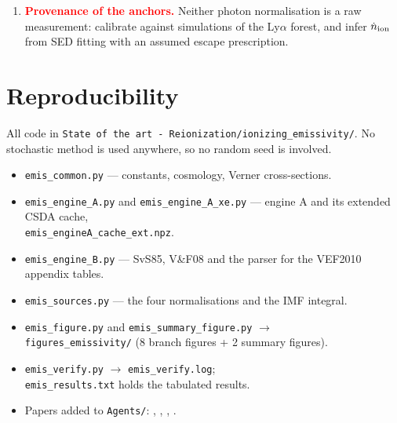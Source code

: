 \documentclass[11pt,a4paper]{article}
\newcommand{\flag}[1]{\textbf{\textcolor{red}{#1}}}
\begin{document}
\begin{enumerate}
  asserted: the H\,\textsc{i}/He\,\textsc{i} split (engine A gives
  $f_{\rm HeI}/f_{\rm HI}\to0.0871$ against $0.0637$ from
  \citeauthor{ShullVanSteenberg1985} rescaled to the Planck helium abundance,
  a 37 per cent difference that cannot be resolved because their helium fits
  assume $x_{\rm HeII}=x_{\rm HII}$); and the two photon emissivity
  normalisations, which are inputs that nothing here can falsify.  The split
  is however shown to be insensitive to the shape of $\Lambda$: tripling the
  helium term moves $f_{\rm HeI}$ by 2.8 per cent at 100~eV and $<0.2$ per
  cent above 1~keV, which is the derivation's own claim.
\item \flag{Provenance of the anchors.}  Neither photon normalisation is a raw
  measurement: \citet{Gaikwad2023} calibrate against simulations of the
  Ly$\alpha$ forest, and \citet{Giovinazzo2026} infer $\dot n_{\rm ion}$ from
  SED fitting with an assumed escape prescription.
\end{enumerate}

\section*{Reproducibility}
All code in \texttt{State of the art - Reionization/ionizing\_emissivity/}.
No stochastic method is used anywhere, so no random seed is involved.
\begin{itemize}\itemsep1pt
\item \texttt{emis\_common.py} --- constants, cosmology, Verner cross-sections.
\item \texttt{emis\_engine\_A.py} and \texttt{emis\_engine\_A\_xe.py} ---
  engine A and its extended CSDA cache,\\
  \texttt{emis\_engineA\_cache\_ext.npz}.
\item \texttt{emis\_engine\_B.py} --- SvS85, V\&F08 and the parser for the
  VEF2010 appendix tables.
\item \texttt{emis\_sources.py} --- the four normalisations and the IMF integral.
\item \texttt{emis\_figure.py} and \texttt{emis\_summary\_figure.py} $\to$\\
  \texttt{figures\_emissivity/} (8 branch figures + 2 summary figures).
\item \texttt{emis\_verify.py} $\to$ \texttt{emis\_verify.log};\\
  \texttt{emis\_results.txt} holds the tabulated results.
\item Papers added to \texttt{Agents/}: \citet{Verner1996},
  \citet{ShullVanSteenberg1985}, \citet{ValdesFerrara2008},
  \citet{Valdes2010}.
\end{itemize}
\end{document}
